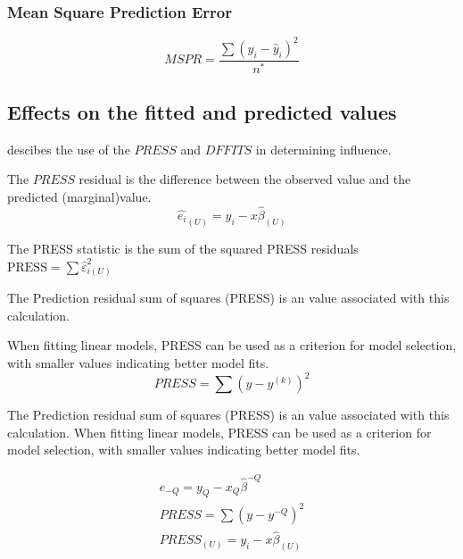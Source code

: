 \documentclass[12pt, a4paper]{report}
\theoremstyle{plain}
\theoremstyle{definition}
\theoremstyle{remark}
\begin{document}
\subsubsection{Mean Square Prediction Error}
\begin{equation}
MSPR = \frac{\sum (y_{i}-\hat{y}_{i})^2}{n^*}
\end{equation}

\subsection{Effects on the fitted and predicted values}
\citet{schabenberger} descibes the use of the $PRESS$ and $DFFITS$ in determining influence.

The $PRESS$ residual is the difference between the observed value and the predicted (marginal)value.
\begin{equation}
\hat{e_{i}}_{(U)} = y_{i} - x\hat{\beta}_{(U)}
\end{equation}











%

The PRESS statistic is the sum of the squared PRESS residuals
$\mbox{PRESS} = \sum \hat{\varepsilon}^2_{i(U)}$



The Prediction residual sum of squares (PRESS) is an value associated with this calculation.

When fitting linear models, PRESS can be used as a criterion for model selection, with smaller values indicating better model fits.
\begin{equation}
PRESS = \sum(y-y^{(k)})^2
\end{equation}

The Prediction residual sum of squares (PRESS) is an value associated with this calculation. When fitting linear models, PRESS can be used as a criterion for model selection, with smaller values indicating better model fits.

\begin{eqnarray*}
	e_{-Q} = y_{Q} - x_{Q}\hat{\beta}^{-Q}\\
	PRESS = \sum(y-y^{-Q})^2\\
	PRESS_{(U)} = y_{i} - x\hat{\beta}_{(U)}\\
\end{eqnarray*}
\end{document}
